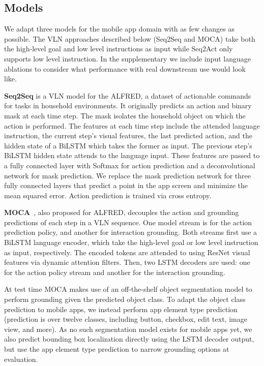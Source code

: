 \subsection{Models} 
We adapt three models for the mobile app domain with as few changes as possible. The VLN approaches described below (Seq2Seq and MOCA) take both the high-level goal and low level instructions as input while Seq2Act only supports low level instruction. In the supplementary we include input language ablations to consider what performance with real downstream use would look like.
\smallskip

\noindent\textbf{Seq2Seq} is a VLN model for the ALFRED, a dataset of actionable commands for tasks in household environments. 
It originally predicts an action and binary mask at each time step. The mask isolates the household object on which the action is performed. The features at each time step include the attended language instruction, the current step's visual features, the last predicted action, and the hidden state of a BiLSTM which takes the former as input. The previous step's BiLSTM hidden state attends to the language input. %
These features are passed to a fully connected layer with Softmax for action prediction and a deconvolutional network for mask prediction. 
We replace the mask prediction network for three fully connected layers that predict a point in the app screen and minimize the mean squared error. Action prediction is trained via cross entropy.
\smallskip

\noindent\textbf{MOCA}~\cite{singh2020moca}, also proposed for ALFRED, decouples the action and grounding predictions of each step in a VLN sequence. One model stream is for the action prediction policy, and another for interaction grounding. Both streams first use a BiLSTM language encoder, which take the high-level goal or low level instruction as input, respectively. The encoded tokens are attended to using ResNet visual features via dynamic attention filters. Then, two LSTM decoders are used: one for the action policy stream and another for the interaction grounding.

At test time MOCA makes use of an off-the-shelf object segmentation model to perform grounding given the predicted object class. To adapt the object class prediction to mobile apps, we instead perform app element type prediction (prediction is over twelve classes, including button, checkbox, edit text, image view, and more). As no such segmentation model exists for mobile apps yet, we also predict bounding box localization directly using the LSTM decoder output, but use the app element type prediction to narrow grounding options at evaluation. 

